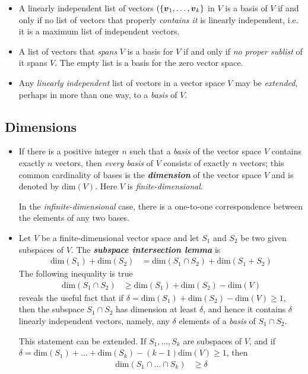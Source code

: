 \documentclass[11pt]{article}
\begin{document}
\begin{itemize}
\item A linearly independent list of vectors $(\left\{\boldsymbol{v}_1, \ldots, \boldsymbol{v}_k\right\}$ in $V$ is a basis of $V$ if and only if no list of vectors that properly \emph{contains it} is linearly independent, i.e. it is a maximum list of independent vectors. 
\item A list of vectors that \emph{spans} $V$ is a basis for $V$ if and only if \emph{no proper sublist} of it spans $V$. The empty list is a basis for the zero vector space.

\item Any \emph{linearly independent} list of vectors in a vector space $V$ may be \emph{extended}, perhaps in more than one way, to a \emph{basis} of $V$. 
\end{itemize}

\subsection{Dimensions}
\begin{itemize}
\item If there is a positive integer $n$ such that a \emph{basis} of the vector space $V$ contains exactly $n$ vectors, then \emph{every basis} of $V$ consists of exactly $n$ vectors; this common cardinality of bases is the \textbf{\emph{dimension}} of the vector space $V$ and is denoted by $\text{dim}(V)$. Here $V$ is \emph{finite-dimensional}.

In the \emph{infinite-dimensional} case, there is a one-to-one correspondence between the elements of any two bases.

\item Let $V$ be a finite-dimensional vector space and let $S_1$ and $S_2$ be two given subspaces of $V$. The \emph{\textbf{subspace intersection lemma}} is
\begin{align}
\text{dim}(S_{1}) + \text{dim}(S_{2}) &= \text{dim}(S_1 \cap S_2) + \text{dim}(S_1 + S_2) \label{eqn: subspace_intersection_lemma}
\end{align} The following inequality is true
\begin{align}
\text{dim}(S_1 \cap S_2)  & \ge \text{dim}(S_{1}) + \text{dim}(S_{2}) - \text{dim}(V) \label{eqn: subspace_intersection_inequality}
\end{align} reveals the useful fact that if $\delta = \text{dim}(S_{1}) + \text{dim}(S_{2}) - \text{dim}(V) \ge 1$, then the subspace $S_1 \cap S_2$ has dimension at least $\delta$, and hence it contains $\delta$ linearly independent vectors, namely, any $\delta$ elements of a \emph{basis} of $S_1 \cap S_2$. 

This statement can be extended. If $S_1, \ldots , S_k$ are subspaces of $V$, and if $\delta = \text{dim}(S_{1}) + \ldots +\text{dim}(S_{k}) - (k-1)\text{dim}(V) \ge 1$, then
\begin{align}
\text{dim}(S_1 \cap \ldots \cap S_k) & \ge \delta \label{eqn: subspace_intersection_inequality_k}
\end{align}
\end{itemize} 
\end{document}
